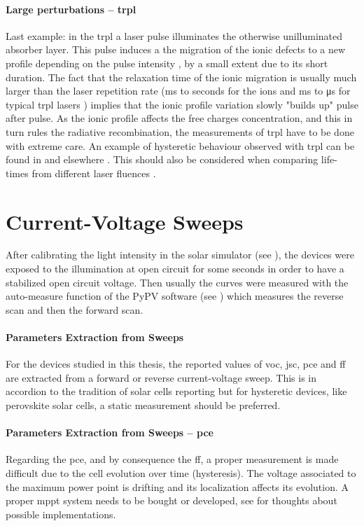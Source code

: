 		\paragraph{Large perturbations -- \gls{trpl}}
		Last example: in the \glsdesc{trpl} a laser pulse illuminates the otherwise unilluminated absorber layer.
		This pulse induces a the migration of the ionic defects to a new profile depending on the pulse intensity \cite{Levine2018}, by a small extent due to its short duration.
		The fact that the relaxation time of the ionic migration is usually much larger than the laser repetition rate (\si{\ms} to seconds for the ions \cite{Jacobs2018} and \si{\ms} to \si{\us} for typical \gls{trpl} lasers \cite{EdinburghInstruments}) implies that the ionic profile variation slowly "builds up" pulse after pulse.
		As the ionic profile affects the free charges concentration, and this in turn rules the radiative recombination, the measurements of \gls{trpl} have to be done with extreme care.
		An example of hysteretic behaviour observed with \gls{trpl} can be found in  and elsewhere \cite{Chen2015,Chen2017}.
		This should also be considered when comparing life-times from different laser fluences \cite{Manser2014}.

\section{Current-Voltage Sweeps}

	After calibrating the light intensity in the solar simulator (see ), the devices were exposed to the illumination at open circuit for some seconds in order to have a stabilized open circuit voltage.
	Then usually the curves were measured with the auto-measure function of the PyPV software (see ) which measures the reverse scan and then the forward scan.

	\paragraph{Parameters Extraction from Sweeps}
	For the devices studied in this thesis, the reported values of \gls{voc}, \gls{jsc}, \gls{pce} and \gls{ff} are extracted from a forward or reverse current-voltage sweep.
	This is in accordion to the tradition of solar cells reporting but for hysteretic devices, like perovskite solar cells, a static measurement should be preferred.

	\paragraph{Parameters Extraction from Sweeps -- \gls{pce}} Regarding the \gls{pce}, and by consequence the \gls{ff}, a proper measurement is made difficult due to the cell evolution over time (hysteresis).
	The voltage associated to the maximum power point is drifting and its localization affects its evolution.
	A proper \gls{mppt} system needs to be bought or developed, see  for thoughts about possible implementations.

